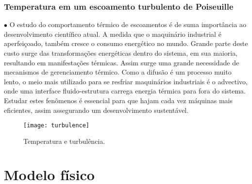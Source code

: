 \documentclass[xcolor=dvipsnames,10pt,aspectratio=169]{beamer}
\begin{document}
	
		\begin{frame}
		\frametitle{Temperatura em um escoamento turbulento de Poiseuille}
			\begin{minipage}[h!]{0.49\textwidth}
			$\bullet$ O estudo do comportamento térmico de escoamentos é de suma importância ao desenvolvimento científico atual. A medida que o maquinário industrial é aperfeiçoado, também cresce o consumo energético no mundo. Grande parte deste custo surge das transformações energéticas dentro do sistema, em sua maioria, resultando em manifestações térmicas. Assim surge uma grande necessidade de mecanismos de gerenciamento térmico. Como a difusão é um processo muito lento, o meio mais utilizado para se resfriar maquinários industriais é o advectivo, onde uma interface fluido-estrutura carrega energia térmica para fora do sistema. Estudar estes fenômenos é essencial para que hajam cada vez máquinas mais eficientes, assim assegurando um desenvolvimento sustentável. 
		\end{minipage}
		\begin{minipage}[h!]{0.49\textwidth}
			\begin{figure}[h!]
				\centering
				\texttt{[image: turbulence]}
				\caption{Temperatura e turbulência.}
			\end{figure}
		\end{minipage}
		\end{frame}





	\section{Modelo físico}
	
	
	
	
	
\end{document}
